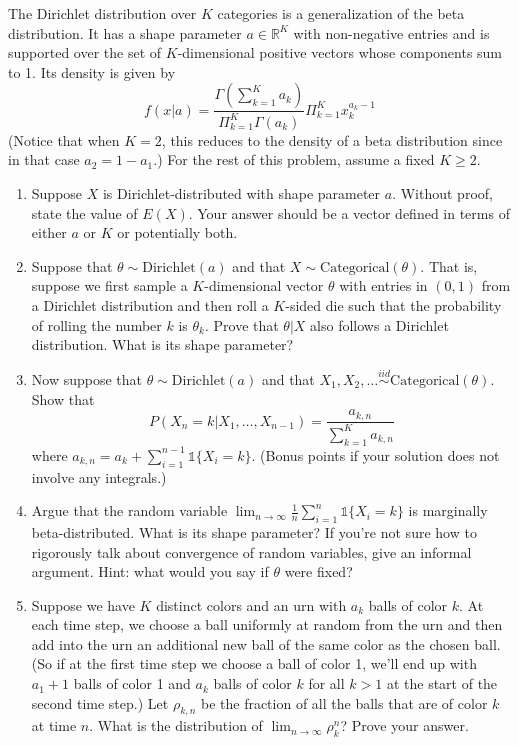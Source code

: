 \documentclass[submit]{harvardml}
\newcommand{\R}{\mathbb{R}}
\theoremstyle{plain}
\begin{document}
\begin{problem}
The Dirichlet distribution over $K$ categories is a generalization of the beta distribution. It has a shape parameter $a \in \R^K$ with non-negative entries and is supported over the set of $K$-dimensional positive vectors whose components sum to 1. Its density is given by
\[
f(x | a) = \frac{\Gamma\left( \sum_{k=1}^K a_k \right)}{\Pi_{k=1}^K \Gamma(a_k)} \Pi_{k=1}^K x_k^{a_k - 1}
\]
(Notice that when $K=2$, this reduces to the density of a beta distribution since in that case $a_2 = 1 - a_1$.) For the rest of this problem, assume a fixed $K \geq 2$.
\begin{enumerate}[label=(\alph*)]
\item Suppose $X$ is Dirichlet-distributed with shape parameter $a$. Without proof, state the value of $E(X)$. Your answer should be a vector defined in terms of either $a$ or $K$ or potentially both.
\item Suppose that $\theta \sim \text{Dirichlet}(a)$ and that $X \sim \text{Categorical}(\theta)$. That is, suppose we first sample a $K$-dimensional vector $\theta$ with entries in $(0,1)$ from a Dirichlet distribution and then roll a $K$-sided die such that the probability of rolling the number $k$ is $\theta_k$. Prove that $\theta | X$ also follows a Dirichlet distribution. What is its shape parameter?
\item Now suppose that $\theta \sim \text{Dirichlet}(a)$ and that $X_1, X_2, \ldots \stackrel{iid}{\sim} \text{Categorical}(\theta)$. Show that
\[
P(X_n = k | X_1, \ldots, X_{n-1}) = \frac{a_{k,n}}{\sum_{k=1}^K a_{k,n}}
\]
where $a_{k,n} = a_k + \sum_{i=1}^{n-1} \mathbb{1}\{X_i = k\}$. (Bonus points if your solution does not involve any integrals.)
\item Argue that the random variable $\lim_{n \rightarrow \infty} \frac{1}{n}\sum_{i=1}^n \mathbb{1}\{X_i = k\}$ is marginally beta-distributed. What is its shape parameter? If you're not sure how to rigorously talk about convergence of random variables, give an informal argument. Hint: what would you say if $\theta$ were fixed?
\item Suppose we have $K$ distinct colors and an urn with $a_k$ balls of color $k$. At each time step, we choose a ball uniformly at random from the urn and then add into the urn an additional new ball of the same color as the chosen ball. (So if at the first time step we choose a ball of color 1, we'll end up with $a_1+1$ balls of color 1 and $a_k$ balls of color $k$ for all $k > 1$ at the start of the second time step.) Let $\rho_{k,n}$ be the fraction of all the balls that are of color $k$ at time $n$. What is the distribution of $\lim_{n \rightarrow \infty} \rho_k^n$? Prove your answer.
\end{enumerate}
\end{problem}
\end{document}

